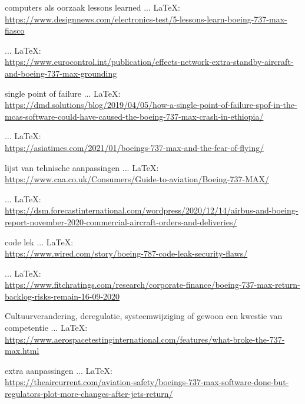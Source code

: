 \begin{thebibliography}{99}
{{{    computers als oorzaak
    lessons learned
     ... \LaTeX:\\ \url{https://www.designnews.com/electronics-test/5-lessons-learn-boeing-737-max-fiasco}
    
     ... \LaTeX:\\ \url{https://www.eurocontrol.int/publication/effects-network-extra-standby-aircraft-and-boeing-737-max-grounding}
    
    single point of failure
     ... \LaTeX:\\ \url{https://dmd.solutions/blog/2019/04/05/how-a-single-point-of-failure-spof-in-the-mcas-software-could-have-caused-the-boeing-737-max-crash-in-ethiopia/}
    
    
     ... \LaTeX:\\ \url{https://asiatimes.com/2021/01/boeings-737-max-and-the-fear-of-flying/}
    
    lijst van tehnische aanpassingen
     ... \LaTeX:\\ \url{https://www.caa.co.uk/Consumers/Guide-to-aviation/Boeing-737-MAX/}
    
     ... \LaTeX:\\ \url{https://dsm.forecastinternational.com/wordpress/2020/12/14/airbus-and-boeing-report-november-2020-commercial-aircraft-orders-and-deliveries/}
    
    code lek
     ... \LaTeX:\\ \url{https://www.wired.com/story/boeing-787-code-leak-security-flaws/}
    
     ... \LaTeX:\\ \url{https://www.fitchratings.com/research/corporate-finance/boeing-737-max-return-backlog-risks-remain-16-09-2020}
    
    Cultuurverandering, deregulatie, systeemwijziging of gewoon een kwestie van competentie
     ... \LaTeX:\\ \url{https://www.aerospacetestinginternational.com/features/what-broke-the-737-max.html}
    
    extra aanpassingen
     ... \LaTeX:\\ \url{https://theaircurrent.com/aviation-safety/boeings-737-max-software-done-but-regulators-plot-more-changes-after-jets-return/}
    
}}}
\end{thebibliography}

